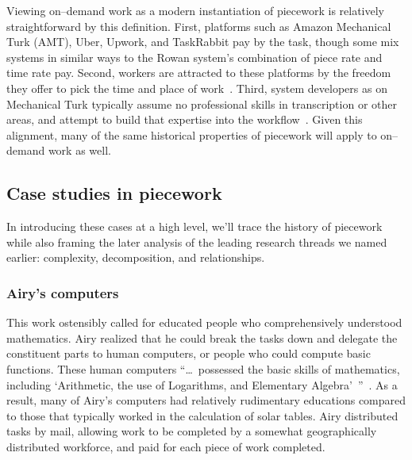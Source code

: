 \documentclass[trackingWork]{subfiles}
\begin{document}
Viewing on--demand work as a modern instantiation of piecework is relatively straightforward by this definition.
First, platforms such as Amazon Mechanical Turk (AMT), Uber, Upwork, and TaskRabbit pay by the task, though some mix systems in similar ways to the Rowan system's combination of piece rate and time rate pay.
Second, workers are attracted to these platforms by the freedom they offer to pick the time and place of work~\cite{martin2014being,whyWouldAnyoneBrewer}.
Third, system developers as on Mechanical Turk typically assume no professional skills in transcription or other areas, and attempt to build that expertise into the workflow~\cite{noronha2011platemate,bernsteinSoylent}.
Given this alignment, many of the same historical properties of piecework will apply to on--demand work as well. 





\subsection{Case studies in piecework}
In introducing these cases at a high level,
we'll trace the history of piecework
while also framing the later analysis of the leading research threads we named earlier:
complexity, decomposition, and relationships.

\subsubsection{Airy's computers}

\begin{comment}
What did I pull from the threads that are related to industrial and railroad workers (i.e. 1920 onward?)

- Airy and his human computers were great:
  - quickly verifiable
  - independent tasks (could be checked without the whole product)
  - narrowly trainable

\end{comment}

This work ostensibly called for educated people who comprehensively understood mathematics.
Airy realized that he could break the tasks down and delegate the constituent parts
to human computers, or people who could compute basic functions.
These human computers ``\dots~possessed the basic skills of mathematics,
including `Arithmetic, the use of Logarithms, and Elementary Algebra'~''~\cite{grier2013computers}.
As a result, many of Airy's computers had relatively rudimentary educations
compared to those that typically worked in the calculation of solar tables.
Airy distributed tasks by mail,
allowing work to be completed by a somewhat geographically distributed workforce,
and paid for each piece of work completed.
\end{document}
